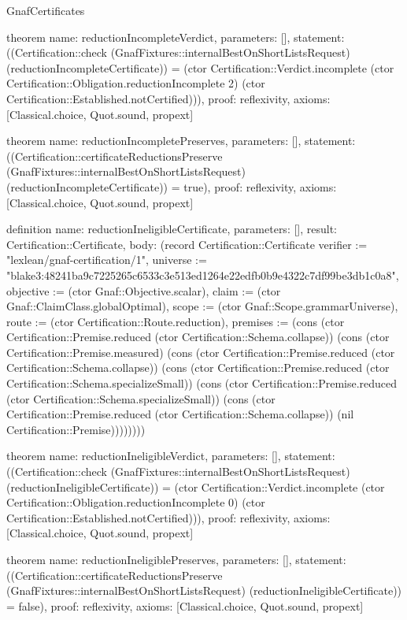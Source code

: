 \begin{lexlean}{GnafCertificates}
\begin{semanticmodule}
theorem{
  name: reductionIncompleteVerdict,
  parameters: [],
  statement: ((Certification::check (GnafFixtures::internalBestOnShortListsRequest) (reductionIncompleteCertificate)) = (ctor Certification::Verdict.incomplete (ctor Certification::Obligation.reductionIncomplete 2) (ctor Certification::Established.notCertified))),
  proof: reflexivity{},
  axioms: [Classical.choice, Quot.sound, propext]
}

theorem{
  name: reductionIncompletePreserves,
  parameters: [],
  statement: ((Certification::certificateReductionsPreserve (GnafFixtures::internalBestOnShortListsRequest) (reductionIncompleteCertificate)) = true),
  proof: reflexivity{},
  axioms: [Classical.choice, Quot.sound, propext]
}

definition{
  name: reductionIneligibleCertificate,
  parameters: [],
  result: Certification::Certificate,
  body: (record Certification::Certificate {verifier := "lexlean/gnaf-certification/1", universe := "blake3:48241ba9c7225265c6533c3e513ed1264e22edfb0b9e4322c7df99be3db1c0a8", objective := (ctor Gnaf::Objective.scalar), claim := (ctor Gnaf::ClaimClass.globalOptimal), scope := (ctor Gnaf::Scope.grammarUniverse), route := (ctor Certification::Route.reduction), premises := (cons (ctor Certification::Premise.reduced (ctor Certification::Schema.collapse)) (cons (ctor Certification::Premise.measured) (cons (ctor Certification::Premise.reduced (ctor Certification::Schema.collapse)) (cons (ctor Certification::Premise.reduced (ctor Certification::Schema.specializeSmall)) (cons (ctor Certification::Premise.reduced (ctor Certification::Schema.specializeSmall)) (cons (ctor Certification::Premise.reduced (ctor Certification::Schema.collapse)) (nil Certification::Premise)))))))})
}

theorem{
  name: reductionIneligibleVerdict,
  parameters: [],
  statement: ((Certification::check (GnafFixtures::internalBestOnShortListsRequest) (reductionIneligibleCertificate)) = (ctor Certification::Verdict.incomplete (ctor Certification::Obligation.reductionIncomplete 0) (ctor Certification::Established.notCertified))),
  proof: reflexivity{},
  axioms: [Classical.choice, Quot.sound, propext]
}

theorem{
  name: reductionIneligiblePreserves,
  parameters: [],
  statement: ((Certification::certificateReductionsPreserve (GnafFixtures::internalBestOnShortListsRequest) (reductionIneligibleCertificate)) = false),
  proof: reflexivity{},
  axioms: [Classical.choice, Quot.sound, propext]
}


\end{semanticmodule}
\end{lexlean}
